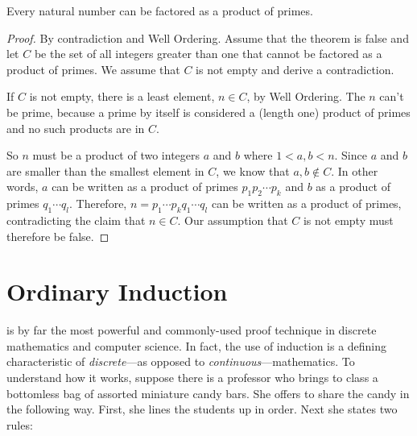 \begin{theorem}\label{factor_into_primes}
Every natural number can be factored as a product of primes.
\end{theorem}
\begin{proof}
By contradiction and Well Ordering.  Assume that the theorem is false
and let $C$ be the set of all integers greater than one that cannot be
factored as a product of primes.  We assume that $C$ is not empty and derive a
contradiction.

If $C$ is not empty, there is a least element, $n \in C$, by Well
Ordering.  The $n$ can't be prime, because a prime by itself is considered
a (length one) product of primes and no such products are in $C$.

So $n$ must be a product of two integers $a$ and $b$ where $1<a,b<n$.
Since $a$ and $b$ are smaller than the smallest element in $C$, we know
that $a,b \notin C$.  In other words, $a$ can be written as a product of
primes $p_1p_2\cdots p_k$ and $b$ as a product of primes $q_1\cdots q_l$.
Therefore, $n=p_1\cdots p_k q_1 \cdots q_l$ can be written as a product of
primes, contradicting the claim that $n \in C$.  Our assumption that
$C$ is not empty must therefore be false.
\end{proof}

\begin{problems}
\practiceproblems
{}

\classproblems
{}

\homeworkproblems
{}
\end{problems}

\section{Ordinary Induction}

 is by far the most powerful and commonly-used proof technique in
discrete mathematics and computer science.  In fact, the use of induction
is a defining characteristic of \emph{discrete}---as opposed to
\emph{continuous}---mathematics.
%
To understand how it works, suppose there is a professor who brings
to class a bottomless bag of assorted miniature candy bars.  She offers to
share the candy in the following way.  First, she lines the students up in
order.  Next she states two rules:

